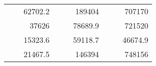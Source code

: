 \begin{table}[]
\begin{tabular}{|ccrccrccc}
\rowcolor[HTML]{DDFDFF} 
\multicolumn{1}{|c|}{\cellcolor[HTML]{FFFFC7}}                                & \multicolumn{1}{c|}{\cellcolor[HTML]{DDFDFF}}                      & \multicolumn{1}{r|}{\cellcolor[HTML]{DAE8FC}62702.2}   & \multicolumn{1}{c|}{\cellcolor[HTML]{FFFFC7}}                                & \multicolumn{1}{c|}{\cellcolor[HTML]{DDFDFF}}                       & \multicolumn{1}{r|}{\cellcolor[HTML]{DDFDFF}189404}    & \multicolumn{1}{c|}{\cellcolor[HTML]{FFFFC7}}                                & \multicolumn{1}{c|}{\cellcolor[HTML]{DDFDFF}}                      & \multicolumn{1}{r|}{\cellcolor[HTML]{DDFDFF}707170}    \\ \cline{3-3} \cline{6-6} \cline{9-9} 
\multicolumn{1}{|c|}{\cellcolor[HTML]{FFFFC7}}                                & \multicolumn{1}{c|}{\cellcolor[HTML]{DDFDFF}}                      & \multicolumn{1}{r|}{\cellcolor[HTML]{DDFDFF}37626}     & \multicolumn{1}{c|}{\cellcolor[HTML]{FFFFC7}}                                & \multicolumn{1}{c|}{\cellcolor[HTML]{DDFDFF}}                       & \multicolumn{1}{r|}{\cellcolor[HTML]{DAE8FC}78689.9}   & \multicolumn{1}{c|}{\cellcolor[HTML]{FFFFC7}}                                & \multicolumn{1}{c|}{\cellcolor[HTML]{DDFDFF}}                      & \multicolumn{1}{r|}{\cellcolor[HTML]{DAE8FC}721520}    \\ \cline{3-3} \cline{6-6} \cline{9-9} 
\rowcolor[HTML]{DDFDFF} 
\multicolumn{1}{|c|}{\cellcolor[HTML]{FFFFC7}}                                & \multicolumn{1}{c|}{\cellcolor[HTML]{DDFDFF}}                      & \multicolumn{1}{r|}{\cellcolor[HTML]{DAE8FC}15323.6}   & \multicolumn{1}{c|}{\cellcolor[HTML]{FFFFC7}}                                & \multicolumn{1}{c|}{\cellcolor[HTML]{DDFDFF}}                       & \multicolumn{1}{r|}{\cellcolor[HTML]{DDFDFF}59118.7}   & \multicolumn{1}{c|}{\cellcolor[HTML]{FFFFC7}}                                & \multicolumn{1}{c|}{\cellcolor[HTML]{DDFDFF}}                      & \multicolumn{1}{r|}{\cellcolor[HTML]{DDFDFF}46674.9}   \\ \cline{3-3} \cline{6-6} \cline{9-9} 
\multicolumn{1}{|c|}{\cellcolor[HTML]{FFFFC7}}                                & \multicolumn{1}{c|}{\cellcolor[HTML]{DDFDFF}}                      & \multicolumn{1}{r|}{\cellcolor[HTML]{DDFDFF}21467.5}   & \multicolumn{1}{c|}{\cellcolor[HTML]{FFFFC7}}                                & \multicolumn{1}{c|}{\cellcolor[HTML]{DDFDFF}}                       & \multicolumn{1}{r|}{\cellcolor[HTML]{DAE8FC}146394}    & \multicolumn{1}{c|}{\cellcolor[HTML]{FFFFC7}}                                & \multicolumn{1}{c|}{\cellcolor[HTML]{DDFDFF}}                      & \multicolumn{1}{r|}{\cellcolor[HTML]{DAE8FC}748156}    \\ \cline{3-3} \cline{6-6} \cline{9-9} 

\end{tabular}
\end{table}
